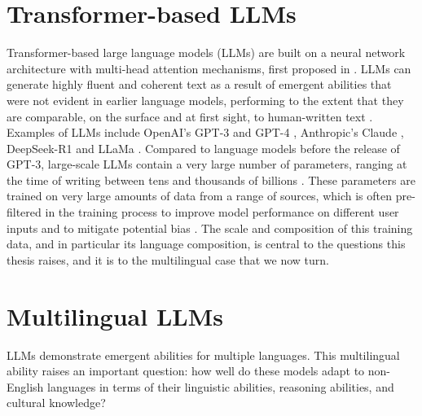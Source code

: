 \documentclass[thesis]{cluu}
\begin{document}
\section{Transformer-based LLMs}
Transformer-based large language models (LLMs) are built on a neural network architecture with multi-head attention mechanisms, first proposed in \textcite{vaswani2017attention}. LLMs can generate highly fluent and coherent text as a result of emergent abilities that were not evident in earlier language models, performing to the extent that they are comparable, on the surface and at first sight, to human-written text \parencite{mahowald2024dissociating,wei2022emergent}. Examples of LLMs include OpenAI's GPT-3 \parencite{brown2020language} and GPT-4 \parencite{openai2023gpt4}, Anthropic's Claude \parencite{anthropic2024claude}, DeepSeek-R1 \parencite{Guo_2025} and LLaMa \parencite{touvron2023llama}. Compared to language models before the release of GPT-3, large-scale LLMs contain a very large number of parameters, ranging at the time of writing between tens and thousands of billions \parencite{brown2020language, DeepSeek-R1ai2024DeepSeek-R1v3, fedus2022switch}. These parameters are trained on very large amounts of data from a range of sources, which is often pre-filtered in the training process to improve model performance on different user inputs and to mitigate potential bias \parencite{raffel2020exploring, dodge2021documenting, gehman2020realtoxicityprompts, brown2020language}. The scale and composition of this training data, and in particular its language composition, is central to the questions this thesis raises, and it is to the multilingual case that we now turn.

\section{Multilingual LLMs}
LLMs demonstrate emergent abilities for multiple languages. This multilingual ability raises an important question: how well do these models adapt to non-English languages in terms of their linguistic abilities, reasoning abilities, and cultural knowledge?
\end{document}
